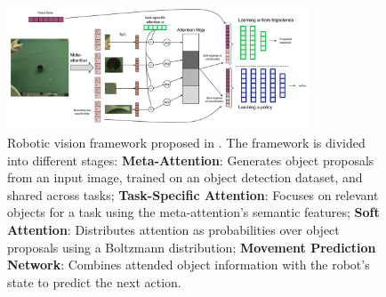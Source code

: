 \begin{figure}[t]
    \centering
    \includegraphics[width=0.8\textwidth]{figures/images/object_prior_framework.png}
    \caption{
            Robotic vision framework proposed in \cite{devin2018deep}. The framework is divided into different stages: \textbf{Meta-Attention}: Generates object proposals from an input image, trained on an object detection dataset, and shared across tasks; \textbf{Task-Specific Attention}: Focuses on relevant objects for a task using the meta-attention's semantic features; \textbf{Soft Attention}: Distributes attention as probabilities over object proposals using a Boltzmann distribution; \textbf{Movement Prediction Network}: Combines attended object information with the robot's state to predict the next action.
        }
    \label{fig:object_prior_framework}
\end{figure}